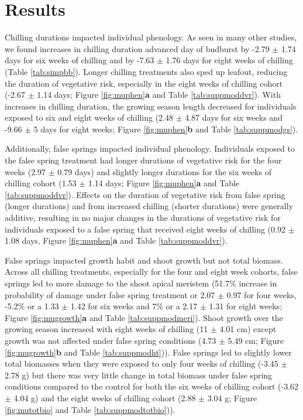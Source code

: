 \documentclass{article}\usepackage[]{graphicx}\usepackage[]{color}
\begin{document}
\section*{Results}
Chilling durations impacted individual phenology. As seen in many other studies, we found increases in chilling duration advanced day of budburst by -2.79 $\pm$ 1.74 days for six weeks of chilling and by -7.63 $\pm$ 1.76 days for eight weeks of chilling (Table \ref{tab:simpbb}). Longer chilling treatments also sped up leafout, reducing the duration of vegetative risk, especially in the eight weeks of chilling cohort (-2.67 $\pm$ 1.14 days; Figure \ref{fig:muphen}\textbf{a} and Table \ref{tab:suppmoddvr}). With increases in chilling duration, the growing season length decreased for individuals exposed to six and eight weeks of chilling (2.48 $\pm$ 4.87 days for six weeks and -9.66 $\pm$ 5 days for eight weeks; Figure \ref{fig:muphen}\textbf{b} and Table \ref{tab:suppmodgs}).
 
Additionally, false springs impacted individual phenology. Individuals exposed to the false spring treatment had longer durations of vegetative risk for the four weeks (2.97 $\pm$ 0.79 days) and slightly longer durations for the six weeks of chilling cohort (1.53 $\pm$ 1.14 days; Figure \ref{fig:muphen}\textbf{a} and Table \ref{tab:suppmoddvr}). Effects on the duration of vegetative risk from false spring (longer durations) and from increased chilling (shorter durations) were generally additive, resulting in no major changes in the durations of vegetative risk for individuals exposed to a false spring that received eight weeks of chilling (0.92 $\pm$ 1.08 days, Figure \ref{fig:muphen}\textbf{a} and Table \ref{tab:suppmoddvr}). 
  
False springs impacted growth habit and shoot growth but not total biomass. Across all chilling treatments, especially for the four and eight week cohorts, false springs led to more damage to the shoot apical meristem (51.7\% increase in probability of damage under false spring treatment or 2.07 $\pm$ 0.97 for four weeks, -5.2\% or a 1.33 $\pm$ 1.42 for six weeks and 7\% or a 2.17 $\pm$ 1.31 for eight weeks; Figure \ref{fig:mugrowth}\textbf{a} and Table \ref{tab:suppmodmeri}). Shoot growth over the growing season increased with eight weeks of chilling (11 $\pm$ 4.01 cm) except growth was not affected under false spring conditions (4.73 $\pm$ 5.49 cm; Figure \ref{fig:mugrowth}\textbf{b} and Table \ref{tab:suppmodht})). False springs led to slightly lower total biomasses when they were exposed to only four weeks of chilling (-3.45 $\pm$ 2.78 g) but there was very little change in total biomass under false spring conditions compared to the control for both the six weeks of chilling cohort (-3.62 $\pm$ 4.04 g) and the eight weeks of chilling cohort (2.88 $\pm$ 3.04 g; Figure \ref{fig:mutotbio} and Table \ref{tab:suppmodtotbio})).
  
\end{document}
